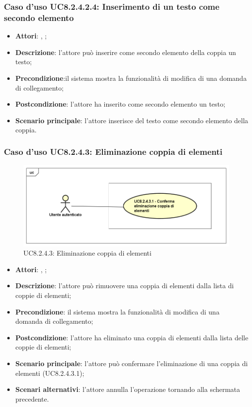 		\subsubsection{Caso d'uso UC8.2.4.2.4: Inserimento di un testo come secondo elemento}
		\label{UC8.2.4.2.4}
		\begin{itemize}
			\item \textbf{Attori}: \uau, \uaupro;
			\item \textbf{Descrizione}: l'attore può inserire come secondo elemento della coppia un testo;
			\item \textbf{Precondizione}:il sistema mostra la funzionalità di modifica di una domanda di collegamento; 
			\item \textbf{Postcondizione}: l'attore ha inserito come secondo elemento un testo;
			\item \textbf{Scenario principale}: l'attore inserisce del testo come secondo elemento della coppia.
		\end{itemize}
	
	\subsubsection{Caso d'uso UC8.2.4.3: Eliminazione coppia di elementi}
	\label{UC8.2.4.3}
	\begin{figure}[h]
		\centering
		\includegraphics[scale=0.5,keepaspectratio]{UML/UC8_2_4_3.png}
		\caption{UC8.2.4.3: Eliminazione coppia di elementi}
	\end{figure}
	\FloatBarrier
	\begin{itemize}
		\item \textbf{Attori}: \uau, \uaupro;
		\item \textbf{Descrizione}: l'attore può rimuovere una coppia di elementi dalla lista di coppie di elementi;
		\item \textbf{Precondizione}: il sistema mostra la funzionalità di modifica di una domanda di collegamento; 
		\item \textbf{Postcondizione}: l'attore ha eliminato una coppia di elementi dalla lista delle coppie di elementi;
		\item \textbf{Scenario principale}: l'attore può confermare l'eliminazione di una coppia di elementi (UC8.2.4.3.1);
		\item \textbf{Scenari alternativi}: l'attore annulla l'operazione tornando alla schermata precedente.
	\end{itemize}

